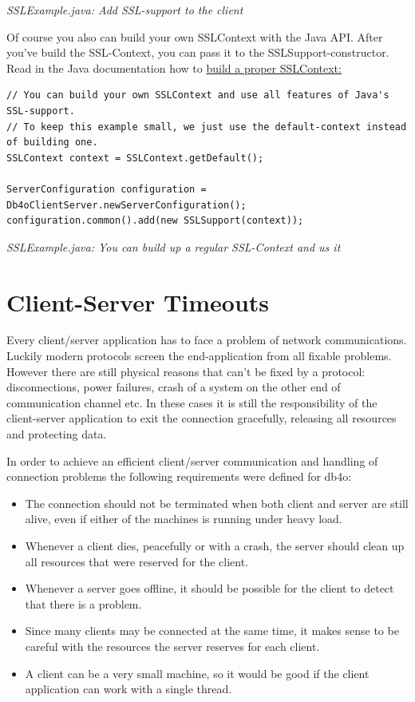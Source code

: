 {\small\itshape SSLExample.java: Add SSL-support to the client\par}
\medskip

Of course you also can build your own SSLContext with the Java API. After you've build the SSL-Context, you can pass it to the SSLSupport-constructor. Read in the Java documentation how to \href{https://docs.oracle.com/javase/8/docs/technotes/guides/security/jsse/JSSERefGuide.html}{build a proper SSLContext:}

\begin{lstlisting}
// You can build your own SSLContext and use all features of Java's SSL-support.
// To keep this example small, we just use the default-context instead of building one.
SSLContext context = SSLContext.getDefault();

ServerConfiguration configuration = Db4oClientServer.newServerConfiguration();
configuration.common().add(new SSLSupport(context));
\end{lstlisting}

{\small\itshape SSLExample.java: You can build up a regular SSL-Context and us it\par}
\medskip

\section{Client-Server Timeouts}
\label{ref:client-server-client-server-timeouts}

Every client/server application has to face a problem of network communications. Luckily modern protocols screen the end-application from all fixable problems. However there are still physical reasons that can't be fixed by a protocol: disconnections, power failures, crash of a system on the other end of communication channel etc. In these cases it is still the responsibility of the client-server application to exit the connection gracefully, releasing all resources and protecting data.

In order to achieve an efficient client/server communication and handling of connection problems the following requirements were defined for db4o:

\begin{itemize}
\item The connection should not be terminated when both client and server are still alive, even if either of the machines is running under heavy load.
\item Whenever a client dies, peacefully or with a crash, the server should clean up all resources that were reserved for the client.
\item Whenever a server goes offline, it should be possible for the client to detect that there is a problem.
\item Since many clients may be connected at the same time, it makes sense to be careful with the resources the server reserves for each client.
\item A client can be a very small machine, so it would be good if the client application can work with a single thread.
\end{itemize}

